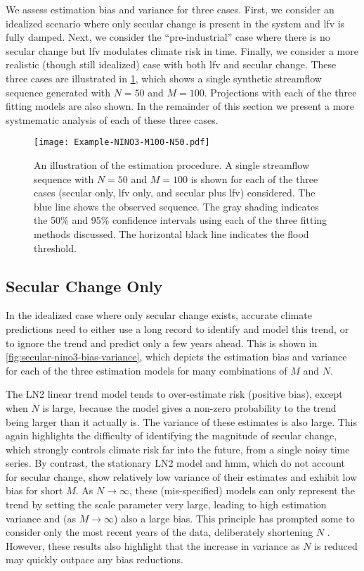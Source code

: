 \documentclass[
]{agujournal2018}
\makeatletter
\newcommand{\ie}{i.e.\@\xspace}
\makeatother
\begin{document}
We assess estimation bias and variance for three cases.
First, we consider an idealized scenario where only secular change is present in the system and \gls{lfv} is fully damped.
Next, we consider the ``pre-industrial'' case where there is no secular change but \gls{lfv} modulates climate risk in time.
Finally, we consider a more realistic (though still idealized) case with both \gls{lfv} and secular change.
These three cases are illustrated in \cref{fig:example-fit}, which shows a single synthetic streamflow sequence generated with $N=50$ and $M=100$.
Projections with each of the three fitting models are also shown.
In the remainder of this section we present a more systmematic analysis of each of these three cases.
\begin{figure}
  \texttt{[image: Example-NINO3-M100-N50.pdf]}
  \caption{
    An illustration of the estimation procedure.
    A single streamflow sequence with $N=50$ and $M=100$ is shown for each of the three cases (secular only, \gls{lfv} only, and secular plus \gls{lfv}) considered.
    The blue line shows the observed sequence.
    The gray shading indicates the 50\% and 95\% confidence intervals using each of the three fitting methods discussed.
    The horizontal black line indicates the flood threshold.
  }\label{fig:example-fit}
\end{figure}

\subsection{Secular Change Only}

In the idealized case where only secular change exists, accurate climate predictions need to either use a long record to identify and model this trend, or to ignore the trend and predict only a few years ahead.
This is shown in \cref{fig:secular-nino3-bias-variance}, which depicts the estimation bias and variance for each of the three estimation models for many combinations of $M$ and $N$.

The LN2 linear trend model tends to over-estimate risk (positive bias), except when $N$ is large, because the model gives a non-zero probability to the trend being larger than it actually is.
The variance of these estimates is also large.
This again highlights the difficulty of identifying the magnitude of secular change, which strongly controls climate risk far into the future, from a single noisy time series.
By contrast, the stationary LN2 model and \gls{hmm}, which do not account for secular change, show relatively low variance of their estimates and exhibit low bias for short $M$.
As $N \rightarrow \infty$, these (mis-specified) models can only represent the trend by setting the scale parameter very large, leading to high estimation variance and (as $M \rightarrow \infty$) also a large bias.
This principle has prompted some to consider only the most recent years of the data, deliberately shortening $N$ \citep[\ie,][]{Muller:2014fc}.
However, these results also highlight that the increase in variance as $N$ is reduced may quickly outpace any bias reductions.
\end{document}
